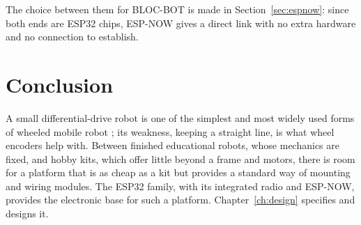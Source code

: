 The choice between them for BLOC-BOT is made in Section~\ref{sec:espnow}: since both ends
are ESP32 chips, ESP-NOW gives a direct link with no extra hardware and no connection to
establish.

\section{Conclusion}
A small differential-drive robot is one of the simplest and most widely used forms of
wheeled mobile robot \cite{siegwart2004}; its weakness, keeping a straight line, is what wheel
encoders help with. Between finished educational robots, whose mechanics are fixed, and
hobby kits, which offer little beyond a frame and motors, there is room for a platform that
is as cheap as a kit but provides a standard way of mounting and wiring modules. The ESP32
family, with its integrated radio and ESP-NOW, provides the electronic base for such a
platform. Chapter~\ref{ch:design} specifies and designs it.

